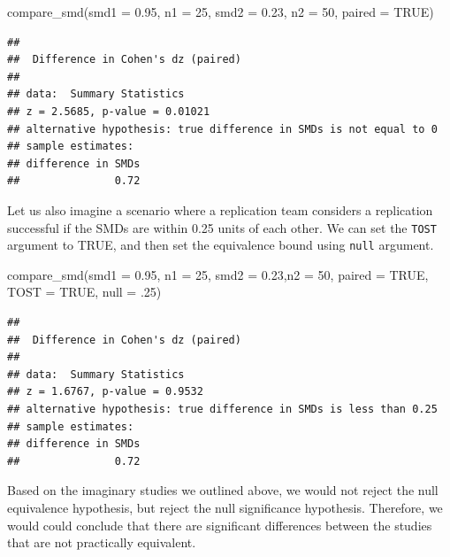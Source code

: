 \documentclass[]{interact}
\theoremstyle{plain}%
\theoremstyle{definition}
\theoremstyle{remark}
\newenvironment{Shaded}{\begin{snugshade}}{\end{snugshade}}
\newcommand{\AttributeTok}[1]{\textcolor[rgb]{0.77,0.63,0.00}{#1}}
\newcommand{\ConstantTok}[1]{\textcolor[rgb]{0.00,0.00,0.00}{#1}}
\newcommand{\DecValTok}[1]{\textcolor[rgb]{0.00,0.00,0.81}{#1}}
\newcommand{\FloatTok}[1]{\textcolor[rgb]{0.00,0.00,0.81}{#1}}
\newcommand{\FunctionTok}[1]{\textcolor[rgb]{0.00,0.00,0.00}{#1}}
\newcommand{\NormalTok}[1]{#1}
\begin{document}
\begin{Shaded}
\begin{Highlighting}[]
\FunctionTok{compare\_smd}\NormalTok{(}\AttributeTok{smd1 =} \FloatTok{0.95}\NormalTok{,}
            \AttributeTok{n1 =} \DecValTok{25}\NormalTok{,}
            \AttributeTok{smd2 =} \FloatTok{0.23}\NormalTok{,}
            \AttributeTok{n2 =} \DecValTok{50}\NormalTok{,}
            \AttributeTok{paired =} \ConstantTok{TRUE}\NormalTok{)}
\end{Highlighting}
\end{Shaded}

\begin{verbatim}
## 
##  Difference in Cohen's dz (paired)
## 
## data:  Summary Statistics
## z = 2.5685, p-value = 0.01021
## alternative hypothesis: true difference in SMDs is not equal to 0
## sample estimates:
## difference in SMDs 
##               0.72
\end{verbatim}

Let us also imagine a scenario where a replication team considers a
replication successful if the SMDs are within 0.25 units of each other.
We can set the \texttt{TOST} argument to TRUE, and then set the
equivalence bound using \texttt{null} argument.

\begin{Shaded}
\begin{Highlighting}[]
\FunctionTok{compare\_smd}\NormalTok{(}\AttributeTok{smd1 =} \FloatTok{0.95}\NormalTok{, }\AttributeTok{n1 =} \DecValTok{25}\NormalTok{, }\AttributeTok{smd2 =} \FloatTok{0.23}\NormalTok{,}\AttributeTok{n2 =} \DecValTok{50}\NormalTok{,}
            \AttributeTok{paired =} \ConstantTok{TRUE}\NormalTok{, }\AttributeTok{TOST =} \ConstantTok{TRUE}\NormalTok{, }\AttributeTok{null =}\NormalTok{ .}\DecValTok{25}\NormalTok{)}
\end{Highlighting}
\end{Shaded}

\begin{verbatim}
## 
##  Difference in Cohen's dz (paired)
## 
## data:  Summary Statistics
## z = 1.6767, p-value = 0.9532
## alternative hypothesis: true difference in SMDs is less than 0.25
## sample estimates:
## difference in SMDs 
##               0.72
\end{verbatim}

Based on the imaginary studies we outlined above, we would not reject
the null equivalence hypothesis, but reject the null significance
hypothesis. Therefore, we would could conclude that there are
significant differences between the studies that are not practically
equivalent.
\end{document}
